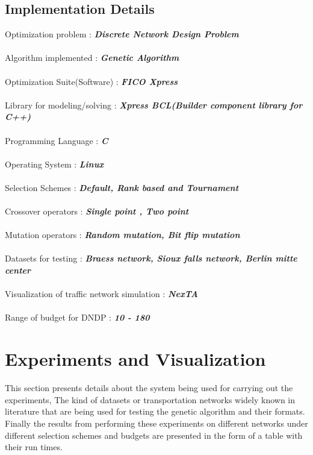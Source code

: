 \documentclass[a4paper, 12pt]{article}
\begin{document}
\subsection{Implementation Details}
\vspace{15mm}
Optimization problem :     \textbf{\textit{Discrete Network Design Problem}}\\~\\
Algorithm implemented :    \textbf{\textit{Genetic Algorithm}}\\~\\
Optimization Suite(Software) : \textbf{\textit{FICO Xpress}}\\~\\
Library for modeling/solving : \textbf{\textit{Xpress BCL(Builder component library for C++)}}\\~\\
Programming Language : \textbf{\textit{C}}\\~\\
Operating System : \textbf{\textit{Linux}}\\~\\
Selection Schemes : \textbf{\textit{Default, Rank based and Tournament}}\\~\\
Crossover operators : \textbf{\textit{Single point , Two point}}\\~\\
Mutation operators : \textbf{\textit{Random mutation, Bit flip mutation}}\\~\\
Datasets for testing : \textbf{\textit{Braess network, Sioux falls network, Berlin mitte center}}\\~\\
Visualization of traffic network simulation : \textbf{\textit{NexTA}}\\~\\
Range of budget for DNDP : \textbf{\textit{10 - 180}}\\
\newpage
\section{Experiments and Visualization}
This section presents details about the system being used for carrying out the experiments, The kind of datasets or transportation networks widely known in literature that are being used for testing the genetic algorithm and their formats. Finally the results from performing these experiments on different networks under different selection schemes and budgets are presented in the form of a table with their run times.
\end{document}
